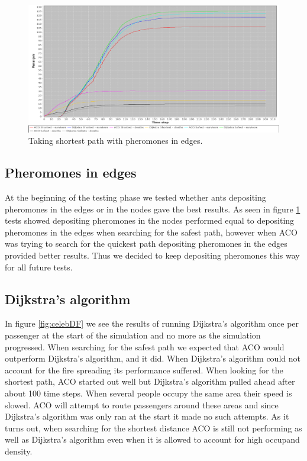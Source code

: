 \begin{figure} [h]
\centering
\hspace*{-1.0in}
\includegraphics[scale=0.35]{images/Graph-using-200-rounds-140-passangers-and-one-hazzard-and-ACO-having-pheremons-in-edges.png}
\caption{Taking shortest path with pheromones in edges.}
\label{fig:celebPherInEdge}
\end{figure}
\subsection{Pheromones in edges}

At the beginning of the testing phase we tested whether ants depositing pheromones in the edges or in the nodes gave the best results.  As seen in figure \ref{fig:celebPherInEdge} tests showed depositing pheromones in the nodes performed equal to depositing pheromones in the edges when searching for the safest path, however when ACO was trying to search for the quickest path depositing pheromones in the edges provided better results. Thus we decided to keep depositing pheromones this way for all future tests.

\subsection{Dijkstra's algorithm}

In figure \ref{fig:celebDF} we see the results of running Dijkstra's algorithm once per passenger at the start of the simulation and no more as the simulation progressed. When searching for the safest path we expected that ACO would outperform Dijkstra's algorithm, and it did. When Dijkstra's algorithm could not account for the fire spreading its performance suffered. When looking for the shortest path, ACO started out well but Dijkstra's algorithm pulled ahead after about 100 time steps. When several people occupy the same area their speed is slowed. ACO will attempt to route passengers around these areas and since Dijkstra's algorithm was only ran at the start it made no such attempts. As it turns out, when searching for the shortest distance ACO is still not performing as well as Dijkstra's algorithm even when it is allowed to account for high occupand density.


